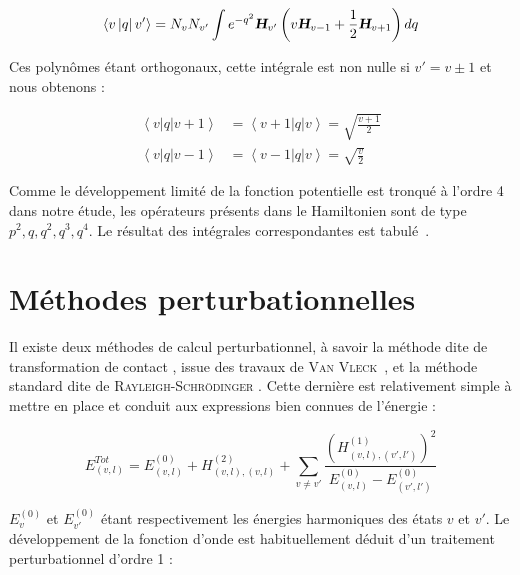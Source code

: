 \documentclass[12pt,a4paper]{book}
\begin{document}
\begin{equation}
\left\langle v \left|q \right|v' \right\rangle = N_v N_{v'} \int e^{-q^2} \textsl{\textbf{H}}_{v'}\left(v\textsl{\textbf{H}}_{v-1} + \frac{1}{2} \textsl{\textbf{H}}_{v+1}\right) dq
\end{equation}

Ces polynômes étant orthogonaux, cette intégrale est non nulle si $v' = v\pm 1$ et nous obtenons :

\begin{align}
\left\langle v \left|q \right| v+1\right\rangle &= \left\langle v+1 \left|q \right| v\right\rangle = \sqrt{\frac{v+1}{2}} \\
\left\langle v \left|q \right| v-1\right\rangle &= \left\langle v-1 \left|q \right| v\right\rangle = \sqrt{\frac{v}{2}}
\end{align}

Comme le développement limité de la fonction potentielle est tronqué à l'ordre 4 dans notre étude, les opérateurs présents dans le Hamiltonien sont de type $p^2,q,q^2,q^3,q^4$. Le résultat des intégrales correspondantes est tabulé~\cite{carbonniere2002calcul}.



\section{Méthodes perturbationnelles}

Il existe deux méthodes de calcul perturbationnel, à savoir la méthode dite de \og transformation de contact \fg, issue des travaux de \textsc{Van Vleck}~\cite{papousek1982molecular,van1929sigma}, et la méthode standard dite de \textsc{Rayleigh-Schrödinger} \cite{oka1967vibration}.
Cette dernière est relativement simple à mettre en place et conduit aux expressions bien connues de l'énergie :

\begin{equation}
E^{Tot}_{(v,l)} = E^{(0)}_{(v,l)} + H^{(2)}_{(v,l),(v,l)} + \sum_{v\neq v'} \frac{(H^{(1)}_{(v,l),(v',l')})^2}{E^{(0)}_{(v,l)} - E^{(0)}_{(v',l')}}
\end{equation}

$E^{(0)}_v$ et $E^{(0)}_{v'}$ étant respectivement les énergies harmoniques des états $v$ et $v'$.
Le développement de la fonction d'onde est habituellement déduit d'un traitement perturbationnel d'ordre 1 :
\end{document}
